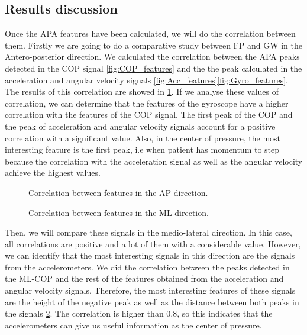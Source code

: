 \subsection{Results discussion}
Once the APA features have been calculated, we will do the correlation between them. Firstly we are going to do a comparative study between FP and GW in the Antero-posterior direction. We calculated the correlation between the APA peaks detected in the COP signal \ref{fig:COP_features} and the the peak calculated in the acceleration and angular velocity signals \ref{fig:Acc_features}\ref{fig:Gyro_features}. The results of this correlation are showed in \ref{fig:Corr_AP}. If we analyse these values of correlation, we can determine that the features of the gyroscope have a higher correlation with the features of the COP signal. The first peak of the COP and the peak of acceleration and angular velocity signals account for a positive correlation with a significant value. Also, in the center of pressure, the most interesting feature is the first peak, i.e when patient has momentum to step because the correlation with the acceleration signal as well as the angular velocity achieve the highest values.

\begin{figure}[H]
	\centering
	\caption{Correlation between features in the AP direction.}
	\label{fig:Corr_AP}
\end{figure}

\begin{figure}[H]
	\centering
	\caption{Correlation between features in the ML direction.}
	\label{fig:Corr_ML}
\end{figure}

Then, we will compare these signals in the medio-lateral direction. In this case, all correlations are positive and a lot of them with a considerable value. However, we can identify that the most interesting signals in this direction are the signals from the accelerometers. We did the correlation between the peaks detected in the ML-COP and the rest of the features obtained from the acceleration and angular velocity signals. Therefore, the most interesting features of these signals are the height of the negative peak as well as the distance between both peaks in the signals \ref{fig:Corr_ML}. The correlation is higher than 0.8, so this indicates that the accelerometers can give us useful information as the center of pressure.


